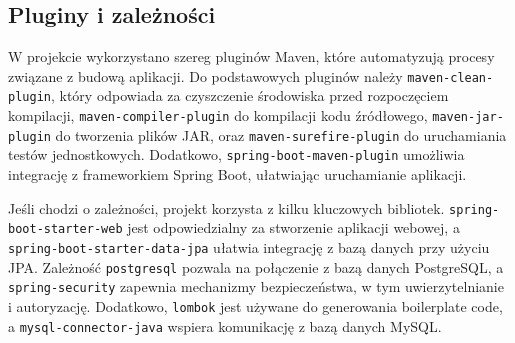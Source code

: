 \subsection{Pluginy i zależności}

W projekcie wykorzystano szereg pluginów Maven, które automatyzują procesy związane z budową aplikacji. Do podstawowych pluginów należy \texttt{maven-clean-plugin}, który odpowiada za czyszczenie środowiska przed rozpoczęciem kompilacji, \texttt{maven-compiler-plugin} do kompilacji kodu źródłowego, \texttt{maven-jar-plugin} do tworzenia plików JAR, oraz \texttt{maven-surefire-plugin} do uruchamiania testów jednostkowych. Dodatkowo, \texttt{spring-boot-maven-plugin} umożliwia integrację z frameworkiem Spring Boot, ułatwiając uruchamianie aplikacji.

Jeśli chodzi o zależności, projekt korzysta z kilku kluczowych bibliotek. \texttt{spring-boot-starter-web} jest odpowiedzialny za stworzenie aplikacji webowej, a \texttt{spring-boot-starter-data-jpa} ułatwia integrację z bazą danych przy użyciu JPA. Zależność \texttt{postgresql} pozwala na połączenie z bazą danych PostgreSQL, a \texttt{spring-security} zapewnia mechanizmy bezpieczeństwa, w tym uwierzytelnianie i autoryzację. Dodatkowo, \texttt{lombok} jest używane do generowania boilerplate code, a \texttt{mysql-connector-java} wspiera komunikację z bazą danych MySQL.